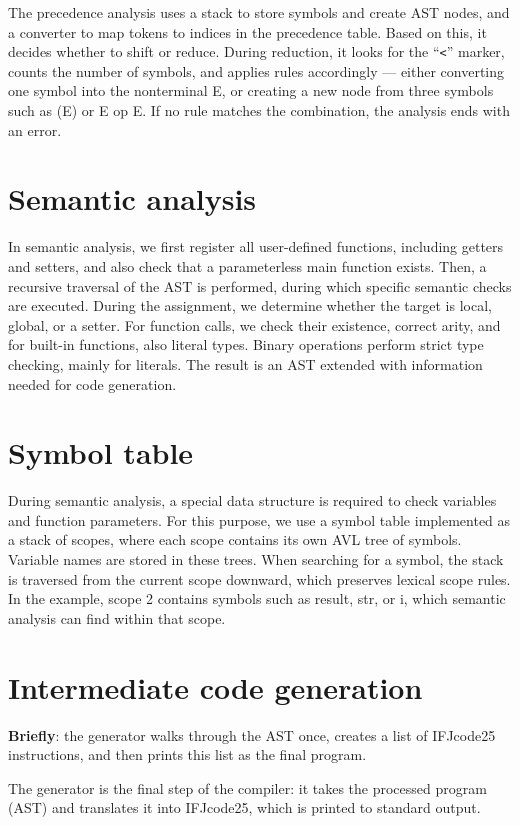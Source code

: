 \documentclass{article}
\begin{document}
The precedence analysis uses a stack to store symbols and create AST nodes, and a converter to map tokens to indices in the precedence table.  
Based on this, it decides whether to shift or reduce.  
During reduction, it looks for the ``\verb|<|'' marker, counts the number of symbols, and applies rules accordingly — either converting one symbol into the nonterminal E, or creating a new node from three symbols such as (E) or E op E.  
If no rule matches the combination, the analysis ends with an error.

\section{Semantic analysis}
In semantic analysis, we first register all user-defined functions, including getters and setters, and also check that a parameterless main function exists.  
Then, a recursive traversal of the AST is performed, during which specific semantic checks are executed.  
During the assignment, we determine whether the target is local, global, or a setter.  
For function calls, we check their existence, correct arity, and for built-in functions, also literal types.  
Binary operations perform strict type checking, mainly for literals.  
The result is an AST extended with information needed for code generation.

\section{Symbol table}
During semantic analysis, a special data structure is required to check variables and function parameters.  
For this purpose, we use a symbol table implemented as a stack of scopes, where each scope contains its own AVL tree of symbols.  
Variable names are stored in these trees.  
When searching for a symbol, the stack is traversed from the current scope downward, which preserves lexical scope rules.  
In the example, scope 2 contains symbols such as result, str, or i, which semantic analysis can find within that scope.

\section{Intermediate code generation}

\textbf{Briefly}: the generator walks through the AST once, creates a list of IFJcode25 instructions, and then prints this list as the final program.\bigskip

The generator is the final step of the compiler: it takes the processed program (AST) and translates it into IFJcode25, which is printed to standard output.
\end{document}
